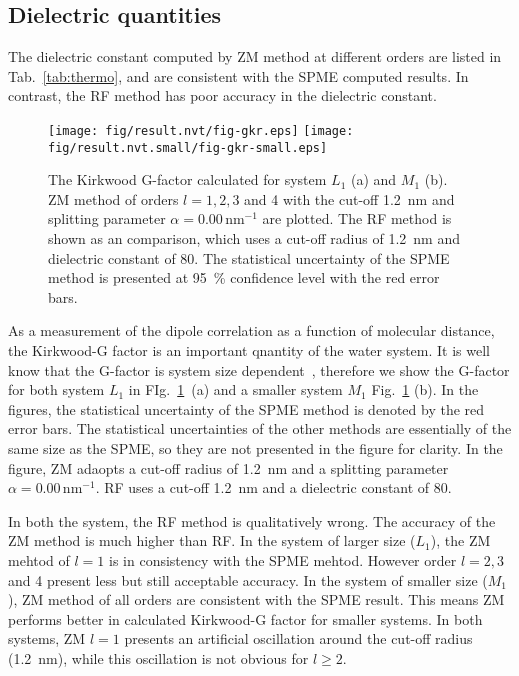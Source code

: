 \documentclass[aip,jcp,a4paper,preprint,unsortedaddress,onecolumn,fleqn]{revtex4-1}
\newcommand{\systemmb}{M_1}
\newcommand{\systemlb}{L_1}
\begin{document}
\subsection{Dielectric quantities}

The dielectric constant computed by ZM method at different orders are listed in Tab.~\ref{tab:thermo},
and are consistent with the SPME computed results. In contrast, the RF method has poor accuracy in
the dielectric constant.

\begin{figure}
  \centering
  \texttt{[image: fig/result.nvt/fig-gkr.eps]}
  \texttt{[image: fig/result.nvt.small/fig-gkr-small.eps]}
  \caption{The Kirkwood G-factor calculated for system $\systemlb$ (a) and $\systemmb$ (b).
    ZM method of orders $l=1,2,3$ and 4 with the cut-off 1.2~nm and splitting parameter $\alpha = 0.00\,\textrm{nm}^{-1}$ are plotted.
    The RF method is shown as an comparison, which uses a cut-off radius of 1.2~nm and dielectric constant of 80.
    The statistical uncertainty of the SPME method is presented at 95~\% confidence level with the red error bars.
  }
  \label{fig:gkr}
\end{figure}

As a measurement of the dipole correlation as a function of molecular distance, the Kirkwood-G factor
is an important qnantity of the water system.
It is well know that the G-factor is system size
dependent~\cite{vanderSpoel2006origin}, therefore we show the G-factor for
both  system $\systemlb$ in FIg.~\ref{fig:gkr}~(a) and a smaller system $\systemmb$
Fig.~\ref{fig:gkr} (b).  In the figures, the statistical uncertainty of
the SPME method is denoted by the red error bars. The statistical uncertainties of the
other methods are essentially of the same size as the SPME, so they are not presented in the figure for
clarity.  In the figure, ZM adaopts a cut-off radius of 1.2~nm and a splitting parameter $\alpha = 0.00\,\textrm{nm}^{-1}$.
RF uses a cut-off 1.2~nm and a dielectric constant of 80.

In both the system, the RF method is qualitatively
wrong. The accuracy of the ZM method is much higher than RF.
In the system of larger size ($\systemlb$), the ZM mehtod of $l=1$ is in consistency with the SPME mehtod. However
order $l=2,3$ and 4  present less but still acceptable accuracy.
In the system of smaller size ($\systemmb$), ZM method of all orders are consistent with the SPME result.
This means ZM performs better in calculated Kirkwood-G factor for smaller systems.
In both systems, ZM $l=1$ presents  an artificial
oscillation around the cut-off radius (1.2~nm), while this oscillation is
not obvious for $l\geq 2$.
\end{document}

